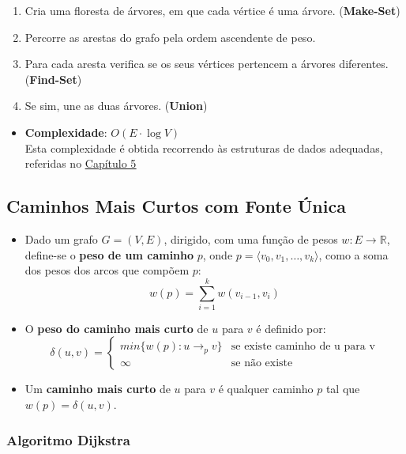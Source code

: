 \documentclass[11pt]{article}
\newcommand{\twopartdef}[4]
{ \displaystyle
	\left\{
		\begin{array}{ll}
			#1 & \mbox{se } #2 \\
			#3 & \mbox{se } #4
		\end{array}
	\right.
}
\begin{document}
\begin{enumerate}
    \item Cria uma floresta de árvores, em que cada vértice é uma árvore. (\textbf{Make-Set})
    \item Percorre as arestas do grafo pela ordem ascendente de peso.
    \item Para cada aresta verifica se os seus vértices pertencem a árvores diferentes. (\textbf{Find-Set})
    \item Se sim, une as duas árvores. (\textbf{Union})
\end{enumerate}
\begin{itemize}[topsep=0pt]
    \item \textbf{Complexidade}: $O(E \cdot \log V)$ \\[8pt]
          Esta complexidade é obtida recorrendo às estruturas de dados adequadas, referidas no \hyperlink{section.5}{\underline{Capítulo 5}}
\end{itemize}

\newpage

\subsection{Caminhos Mais Curtos com Fonte Única} 

\begin{itemize}
    \item Dado um grafo $G = (V,E)$, dirigido, com uma função de pesos $w : E \rightarrow \mathbb{R}$, define-se o \textbf{peso de um caminho} $p$, onde $p=\langle v_0,v_1, \ldots,v_k \rangle $, como a soma dos pesos dos arcos que compõem $p$:
          \begin{equation*}
              w(p) = \sum_{i=1}^{k} w(v_{i-1},v_i)
          \end{equation*}
    \item O \textbf{peso do caminho mais curto} de $u$ para $v$ é definido por:
          \begin{equation*}
              \delta(u,v) = \twopartdef{min\{w(p): u \rightarrow_p v\}}
              {\text{existe caminho de u para v}}
              {\infty}{\text{não existe}}
          \end{equation*}
    \item Um \textbf{caminho mais curto} de $u$ para $v$ é qualquer caminho $p$ tal que $w(p) = \delta(u,v)$.
\end{itemize}

\subsubsection{Algoritmo Dijkstra}
\end{document}
